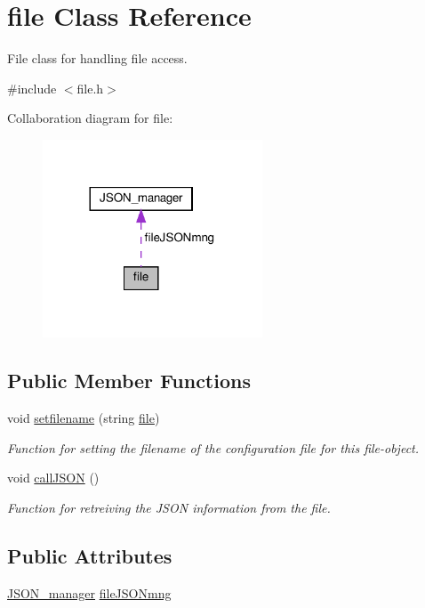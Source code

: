 \hypertarget{classfile}{}\section{file Class Reference}
\label{classfile}


File class for handling file access.  




{\ttfamily \#include $<$file.\+h$>$}



Collaboration diagram for file\+:
\nopagebreak
\begin{figure}[H]
\begin{center}
\leavevmode
\includegraphics[width=185pt]{classfile__coll__graph}
\end{center}
\end{figure}
\subsection*{Public Member Functions}
\begin{DoxyCompactItemize}
\item 
void \hyperlink{classfile_a04d228a8eabeb75ed6f6f7c87f5053db}{setfilename} (string \hyperlink{classfile}{file})
\begin{DoxyCompactList}\small\item\em Function for setting the filename of the configuration file for this file-\/object. \end{DoxyCompactList}\item 
void \hyperlink{classfile_a6f3aeac1f4b08cd52b7879ea999fded1}{call\+J\+S\+ON} ()
\begin{DoxyCompactList}\small\item\em Function for retreiving the J\+S\+ON information from the file. \end{DoxyCompactList}\end{DoxyCompactItemize}
\subsection*{Public Attributes}
\begin{DoxyCompactItemize}
\item 
\hyperlink{classJSON__manager}{J\+S\+O\+N\+\_\+manager} \hyperlink{classfile_aaba2c5a6566d9cbbc9fb613475eb1ce7}{file\+J\+S\+O\+Nmng}
\end{DoxyCompactItemize}
